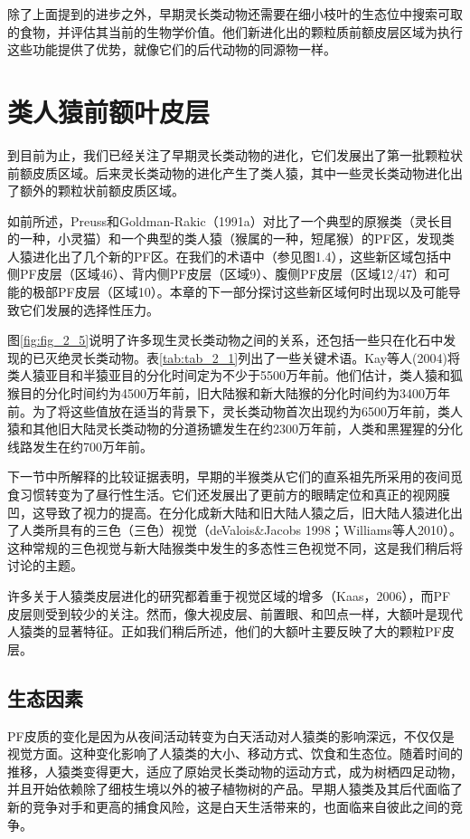 除了上面提到的进步之外，早期灵长类动物还需要在细小枝叶的生态位中搜索可取的食物，并评估其当前的生物学价值。他们新进化出的颗粒质前额皮层区域为执行这些功能提供了优势，就像它们的后代动物的同源物一样。

\section{类人猿前额叶皮层}
到目前为止，我们已经关注了早期灵长类动物的进化，它们发展出了第一批颗粒状前额皮质区域。后来灵长类动物的进化产生了类人猿，其中一些灵长类动物进化出了额外的颗粒状前额皮质区域。

如前所述，Preuss和Goldman-Rakic（1991a）对比了一个典型的原猴类（灵长目的一种，小灵猫）和一个典型的类人猿（猴属的一种，短尾猴）的PF区，发现类人猿进化出了几个新的PF区。在我们的术语中（参见图1.4），这些新区域包括中侧PF皮层（区域46）、背内侧PF皮层（区域9）、腹侧PF皮层（区域12/47）和可能的极部PF皮层（区域10）。本章的下一部分探讨这些新区域何时出现以及可能导致它们发展的选择性压力。

图\ref{fig:fig_2_5}说明了许多现生灵长类动物之间的关系，还包括一些只在化石中发现的已灭绝灵长类动物。表\ref{tab:tab_2_1}列出了一些关键术语。Kay等人(2004)将类人猿亚目和半猿亚目的分化时间定为不少于5500万年前。他们估计，类人猿和狐猴目的分化时间约为4500万年前，旧大陆猴和新大陆猴的分化时间约为3400万年前。为了将这些值放在适当的背景下，灵长类动物首次出现约为6500万年前，类人猿和其他旧大陆灵长类动物的分道扬镳发生在约2300万年前，人类和黑猩猩的分化线路发生在约700万年前。

下一节中所解释的比较证据表明，早期的半猴类从它们的直系祖先所采用的夜间觅食习惯转变为了昼行性生活。它们还发展出了更前方的眼睛定位和真正的视网膜凹，这导致了视力的提高。在分化成新大陆和旧大陆人猿之后，旧大陆人猿进化出了人类所具有的三色（三色）视觉（deValois\&Jacobs 1998；Williams等人2010）。这种常规的三色视觉与新大陆猴类中发生的多态性三色视觉不同，这是我们稍后将讨论的主题。

许多关于人猿类皮层进化的研究都着重于视觉区域的增多（Kaas，2006），而PF皮层则受到较少的关注。然而，像大视皮层、前置眼、和凹点一样，大额叶是现代人猿类的显著特征。正如我们稍后所述，他们的大额叶主要反映了大的颗粒PF皮层。

\subsection{生态因素}
PF皮质的变化是因为从夜间活动转变为白天活动对人猿类的影响深远，不仅仅是视觉方面。这种变化影响了人猿类的大小、移动方式、饮食和生态位。随着时间的推移，人猿类变得更大，适应了原始灵长类动物的运动方式，成为树栖四足动物，并且开始依赖除了细枝生境以外的被子植物树的产品。早期人猿类及其后代面临了新的竞争对手和更高的捕食风险，这是白天生活带来的，也面临来自彼此之间的竞争。

